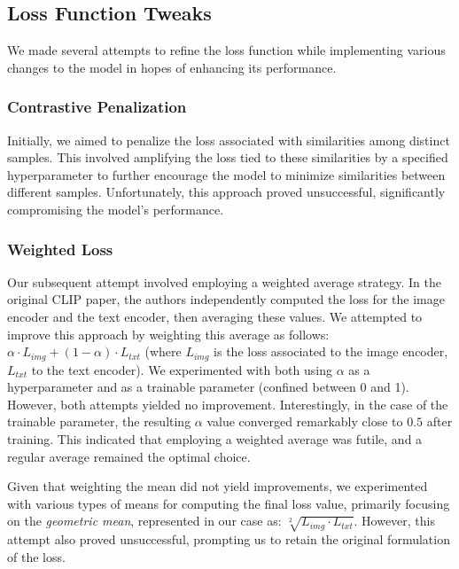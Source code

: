 \documentclass[10pt,twocolumn,letterpaper]{article}
\begin{document}
\subsection{Loss Function Tweaks}
We made several attempts to refine the loss function while implementing various changes to the model in hopes of enhancing its performance.

\subsubsection{Contrastive Penalization}
Initially, we aimed to penalize the loss associated with similarities among distinct samples. This involved amplifying the loss tied to these similarities by a specified hyperparameter to further encourage the model to minimize similarities between different samples. Unfortunately, this approach proved unsuccessful, significantly compromising the model's performance.

\subsubsection{Weighted Loss}
Our subsequent attempt involved employing a weighted average strategy. In the original CLIP paper, the authors independently computed the loss for the image encoder and the text encoder, then averaging these values. We attempted to improve this approach by weighting this average as follows: $\alpha \cdot L_{img} + (1 - \alpha) \cdot L_{txt}$ (where $L_{img}$ is the loss associated to the image encoder, $L_{txt}$ to the text encoder). We experimented with both using $\alpha$ as a hyperparameter and as a trainable parameter (confined between 0 and 1). However, both attempts yielded no improvement. Interestingly, in the case of the trainable parameter, the resulting $\alpha$ value converged remarkably close to $0.5$ after training. This indicated that employing a weighted average was futile, and a regular average remained the optimal choice.

Given that weighting the mean did not yield improvements, we experimented with various types of means for computing the final loss value, primarily focusing on the \textit{geometric mean}, represented in our case as: $\sqrt[2]{L_{img} \cdot L_{txt}}$. However, this attempt also proved unsuccessful, prompting us to retain the original formulation of the loss.
\end{document}
